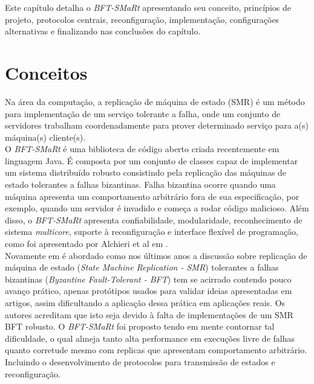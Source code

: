 Este capítulo detalha o \textit{BFT-SMaRt} apresentando seu conceito, princípios de projeto, protocolos centrais, reconfiguração, implementação, configurações alternativas e finalizando nas conclusões do capítulo.


	\section{Conceitos}
	Na área da computação, a replicação de máquina de estado (SMR) é um método para implementação de um serviço tolerante a falha, onde um conjunto de servidores trabalham coordenadamente para prover determinado serviço para a(s) máquina(s) cliente(s). \\
		
	O \textit{BFT-SMaRt} é uma biblioteca de código aberto criada recentemente em linguagem Java. É composta por um conjunto de classes capaz de implementar um sistema distribuído robusto consistindo pela replicação das máquinas de estado tolerantes a falhas bizantinas. Falha bizantina ocorre quando uma máquina apresenta um comportamento arbitrário fora de sua especificação, por exemplo, quando um servidor é invadido e começa a rodar código malicioso. Além disso, o \textit{BFT-SMaRt} apresenta confiabilidade, modularidade, reconhecimento de sistema \textit{multicore}, suporte à reconfiguração e interface flexível de programação, como foi apresentado por Alchieri et al em \cite{bessani3}. \\
	
	Novamente em \cite{bessani3} é abordado como nos últimos anos a discussão sobre replicação de máquina de estado (\textit{State Machine Replication - SMR}) tolerantes a falhas bizantinas (\textit{Byzantine Fault-Tolerant - BFT}) tem se acirrado contendo pouco avanço prático, apenas protótipos usados para validar ideias apresentadas em artigos, assim dificultando a aplicação dessa prática em aplicações reais. Os autores acreditam que isto seja devido à falta de implementações de um SMR BFT robusto. O \textit{BFT-SMaRt} foi proposto tendo em mente contornar tal dificuldade, o qual almeja tanto alta performance em execuções livre de falhas quanto corretude mesmo com replicas que apresentam comportamento arbitrário. Incluindo o desenvolvimento de protocolos para transmissão de estados e reconfiguração. \\
	

